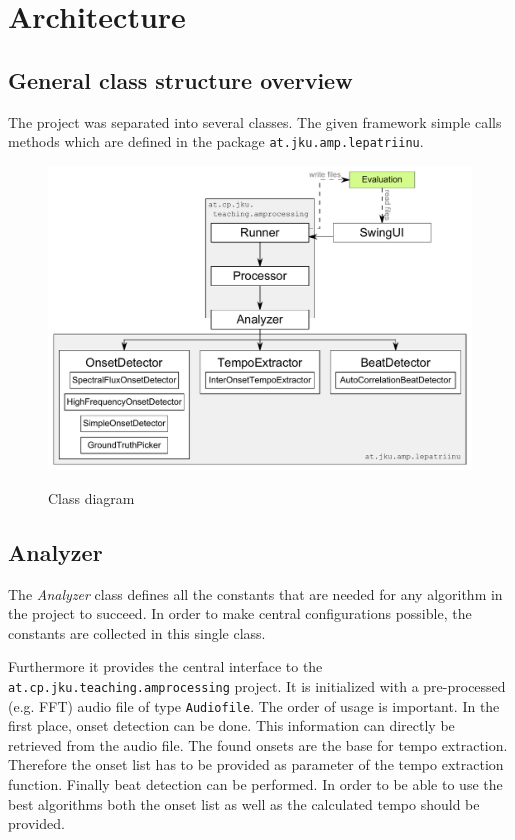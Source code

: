 \chapter{Architecture} \label{cpt:architecture}

\section{General class structure overview}
The project was separated into several classes. The given framework simple calls
methods which are defined in the package \texttt{at.jku.amp.lepatriinu}.

\begin{figure}[htp]
  \centering
  \includegraphics[width=\textwidth]{chapter/ClassDiagram}
  \label{fig:classdiagram}
  \caption{Class diagram}
\end{figure}

\section{\ttfamily Analyzer}
The \emph{Analyzer} class defines all the constants that are needed for any
algorithm in the project to succeed. In order to make central configurations
possible, the constants are collected in this single class.

Furthermore it provides the central interface to the
\texttt{at.cp.jku.teaching.am\-pro\-ces\-sing} project. It is initialized with a
pre-processed (e.g. FFT) audio file of type \texttt{Audiofile}. The order of
usage is important. In the first place, onset detection can be done. This
information can directly be retrieved from the audio file. The found onsets are
the base for tempo extraction. Therefore the onset list has to be provided as
parameter of the tempo extraction function. Finally beat detection can be
performed. In order to be able to use the best algorithms both the onset list as
well as the calculated tempo should be provided.

